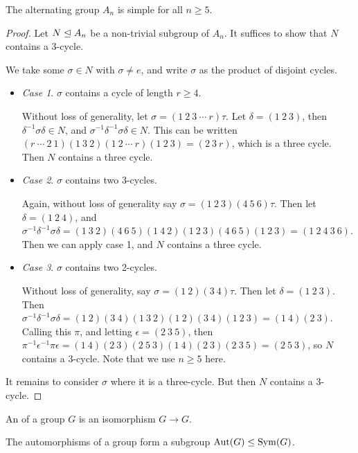 \documentclass[a4paper]{scrreprt}
\begin{document}
\begin{theorem}[$A_n$ is Simple]
The alternating group $A_n$ is simple for all $n \geq 5$.
\end{theorem}
\begin{proof}
	Let $N \trianglelefteq A_n$ be a non-trivial subgroup of $A_n$. It suffices to show that $N$ contains a $3$-cycle.
	
	We take some $\sigma \in N$ with $\sigma \neq e$, and write $\sigma$ as the product of disjoint cycles.

	\begin{itemize}
		\item \emph{Case 1}. $\sigma$ contains a cycle of length $r \geq 4$.
	
		Without loss of generality, let $\sigma = (1\ 2\ 3\ \cdots\ r)\tau$. Let $\delta = (1\ 2\ 3)$, then $\delta^{-1} \sigma \delta \in N$, and $\sigma^{-1}\delta^{-1} \sigma \delta \in N$. This can be written $(r\ \cdots\ 2\ 1)(1\ 3\ 2)(1\ 2\ \cdots\ r)(1\ 2\ 3) = (2\ 3\ r)$, which is a three cycle. Then $N$ contains a three cycle.

		\item \emph{Case 2}. $\sigma$ contains two 3-cycles.
		
		Again, without loss of generality say $\sigma = (1\ 2\ 3)(4\ 5\ 6)\tau$. Then let $\delta = (1\ 2\ 4)$, and $\sigma^{-1}\delta^{-1}\sigma \delta = (1\ 3\ 2)(4\ 6\ 5) (1\ 4\ 2)(1\ 2\ 3)(4\ 6\ 5)(1\ 2\ 3) = (1\ 2\ 4\ 3\ 6)$. Then we can apply case 1, and $N$ contains a three cycle.
		\item \emph{Case 3}. $\sigma$ contains two 2-cycles.
		
		Without loss of generality, say $\sigma = (1\ 2)(3\ 4) \tau$. Then let $\delta = (1\ 2\ 3)$. Then $\sigma^{-1}\delta^{-1} \sigma \delta = (1\ 2)(3\ 4)(1\ 3\ 2)(1\ 2)(3\ 4)(1\ 2\ 3) = (1\ 4)(2\ 3)$. Calling this $\pi$, and letting $\epsilon = (2\ 3\ 5)$, then $\pi^{-1} \epsilon^{-1} \pi \epsilon = (1\ 4)(2\ 3)(2\ 5\ 3)(1\ 4)(2\ 3)(2\ 3\ 5) = (2\ 5\ 3)$, so $N$ contains a $3$-cycle. Note that we use $n \geq 5$ here. 
	\end{itemize}
	It remains to consider $\sigma$ where it is a three-cycle. But then $N$ contains a 3-cycle.
\end{proof}

\begin{definition}[Automorphism]
	An  of a group $G$ is an isomorphism $G \rightarrow G$.
\end{definition}

The automorphisms of a group form a subgroup $\operatorname{Aut}(G) \leq \operatorname{Sym}(G)$.
\end{document}
